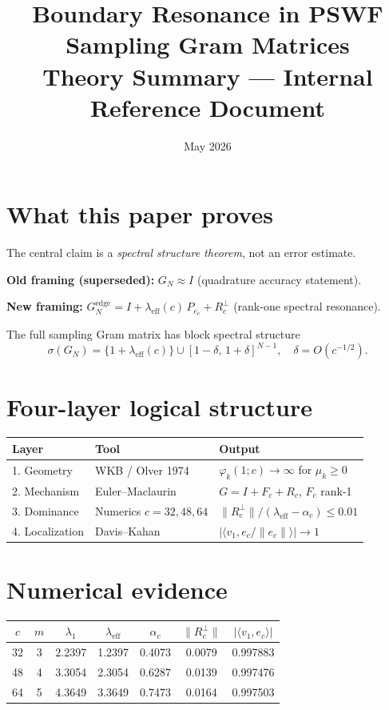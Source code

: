 \documentclass[11pt,a4paper]{article}
\title{\textbf{Boundary Resonance in PSWF Sampling Gram Matrices}\\[6pt]
       \large Theory Summary --- Internal Reference Document}
\author{}
\date{May 2026}
\theoremstyle{definition}
\begin{document}
\maketitle

\section{What this paper proves}

The central claim is a \emph{spectral structure theorem}, not an error estimate.

\medskip
\noindent\textbf{Old framing (superseded):}
$G_N \approx I$ (quadrature accuracy statement).

\noindent\textbf{New framing:}
$G_N^{\mathrm{edge}} = I + \lambda_{\mathrm{eff}}(c)\,P_{e_c} + R_c^\perp$
(rank-one spectral resonance).

The full sampling Gram matrix has block spectral structure
\[
  \sigma(G_N)
  = \bigl\{1 + \lambda_{\mathrm{eff}}(c)\bigr\}
  \cup
  [1-\delta,\,1+\delta]^{N-1},
  \quad \delta = O(c^{-1/2}).
\]

\section{Four-layer logical structure}

\begin{center}
\begin{tabular}{lll}
\toprule
Layer & Tool & Output \\
\midrule
1. Geometry & WKB / Olver 1974 & $\varphi_k(1;c)\to\infty$ for $\mu_k\ge 0$ \\
2. Mechanism & Euler--Maclaurin & $G = I + F_c + R_c$, $F_c$ rank-1 \\
3. Dominance & Numerics $c=32,48,64$ & $\|R_c^\perp\|/(\lambda_{\mathrm{eff}}-\alpha_c) \le 0.01$ \\
4. Localization & Davis--Kahan & $|\langle v_1,e_c/\|e_c\|\rangle|\to 1$ \\
\bottomrule
\end{tabular}
\end{center}

\section{Numerical evidence}

\begin{center}
\begin{tabular}{ccccccc}
\toprule
$c$ & $m$ & $\lambda_1$ & $\lambda_{\mathrm{eff}}$ & $\alpha_c$
    & $\|R_c^\perp\|$ & $|\langle v_1,e_c\rangle|$ \\
\midrule
32 & 3 & 2.2397 & 1.2397 & 0.4073 & 0.0079 & 0.997883 \\
48 & 4 & 3.3054 & 2.3054 & 0.6287 & 0.0139 & 0.997476 \\
64 & 5 & 4.3649 & 3.3649 & 0.7473 & 0.0164 & 0.997503 \\
\bottomrule
\end{tabular}
\end{center}
\end{document}
